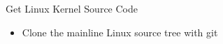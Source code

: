 \setuplabframe
{Get Linux Kernel Source Code}
{
  \begin{itemize}
  \item Clone the mainline Linux source tree with git
  \end{itemize}
}
